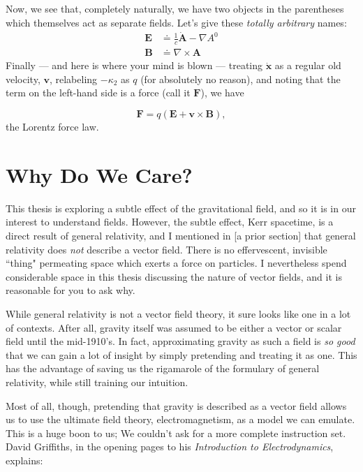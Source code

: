 \documentclass[11pt]{article}
\begin{document}
Now, we see that, completely naturally, we have two objects in the parentheses which themselves act as separate fields.  Let's give these \emph{totally arbitrary} names:
\begin{align}
\mathbf{E} &\doteq \frac{1}{c}\dot{\mathbf{A}} - \nabla A^{0}\\
\mathbf{B} &\doteq \nabla \times \mathbf{A}
\end{align}
Finally --- and here is where your mind is blown --- treating $\dot{\mathbf{x}}$ as a regular old velocity, $\mathbf{v}$, relabeling $-\kappa_2$ as $q$ (for absolutely no reason), and noting that the term on the left-hand side is a force (call it $\mathbf{F}$), we have

\begin{equation}\label{eq:lorentz}
\boxed{\mathbf{F} = q\left(\mathbf{E+v\times B}\right)},
\end{equation}
the Lorentz force law.

\section{Why Do We Care?}
This thesis is exploring a subtle effect of the gravitational field, and so it is in our interest to understand fields.  However, the subtle effect, Kerr spacetime, is a direct result of general relativity, and I mentioned in [a prior section] that general relativity does \emph{not} describe a vector field.  There is no effervescent, invisible ``thing" permeating space which exerts a force on particles.  I nevertheless spend considerable space in this thesis discussing the nature of vector fields, and it is reasonable for you to ask why.

While general relativity is not a vector field theory, it sure looks like one in a lot of contexts.  After all, gravity itself was assumed to be either a vector or scalar field until the mid-1910's.  In fact, approximating gravity as such a field is \emph{so good} that we can gain a lot of insight by simply pretending and treating it as one.  This has the advantage of saving us the rigamarole of the formulary of general relativity, while still training our intuition.

Most of all, though, pretending that gravity is described as a vector field allows us to use the ultimate field theory, electromagnetism, as a model we can emulate.  This is a huge boon to us; We couldn't ask for a more complete instruction set.  David Griffiths, in the opening pages to his \emph{Introduction to Electrodynamics}, explains:
  
\end{document}
